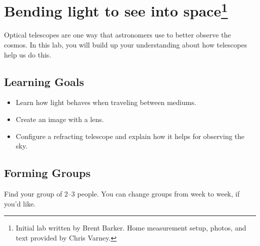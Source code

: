 \chapter[Bending light to see into space]{Bending light to see into space\footnote{Initial lab written by Brent Barker. Home measurement setup, photos, and text provided by Chris Varney.}}



Optical telescopes are one way that astronomers use to better observe the cosmos. In this lab, you will build up your understanding about how telescopes help us do this.

\section{Learning Goals}

\begin{itemize}
	\item Learn how light behaves when traveling between mediums.
	
	\item Create an image with a lens.
	
	\item Configure a refracting telescope and explain how it helps for observing the sky.
\end{itemize}

\section{Forming Groups}

Find your group of 2--3 people. You can change groups from week to week, if you'd like.

